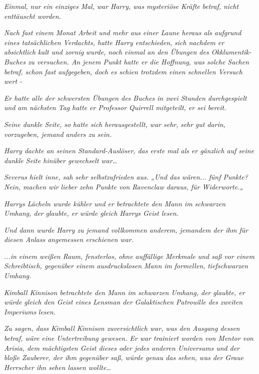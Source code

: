 {\emph{\emph{Einmal,}} \emph{nur} \emph{\emph{ein einziges Mal,}} \emph{war Harry,} \emph{was mysteriöse Kräfte} \emph{betraf, nicht enttäuscht worden.}

\emph{Nach fast einem Monat Arbeit und mehr aus einer Laune heraus als aufgrund eines tatsächlichen Verdachts, hatte Harry entschieden,} \emph{sich nachdem er} \emph{absichtlich kalt und zornig} \emph{wurde,} \emph{noch einmal an den Übungen des Okklumentik-Buches zu versuchen. An jenem Punkt hatte er die Hoffnung, was solche Sachen betraf, schon fast aufgegeben, doch es schien trotzdem einen schnellen Versuch wert -}

\emph{Er hatte alle der schwersten Übungen des Buches in zwei Stunden durchgespielt und am nächsten Tag hatte er Professor Quirrell mitgeteilt, er sei bereit.}

\emph{Seine dunkle Seite, so hatte sich herausgestellt, war sehr,} \emph{\emph{sehr}} \emph{gut darin, vorzugeben, jemand anders zu sein.}

\emph{Harry dachte an seinen Standard-Auslöser, das erste mal als er gänzlich auf seine dunkle Seite hinüber gewechselt war…}

\emph{\emph{Severus hielt inne, sah sehr selbstzufrieden aus. „Und das wären... fünf Punkte? Nein, machen wir lieber zehn Punkte von Ravenclaw daraus, für Widerworte.„}}

\emph{Harrys Lächeln wurde kühler und er betrachtete den Mann im schwarzen Umhang, der} \emph{glaubte, er würde gleich Harrys Geist lesen.}

\emph{Und dann wurde Harry zu jemand vollkommen anderem, jemandem der ihm für diesen Anlass angemessen erschienen war.}

\emph{...in einem weißen Raum, fensterlos, ohne auffällige Merkmale und saß vor einem Schreibtisch, gegenüber einem ausdruckslosen Mann im} \emph{formellen,} \emph{tiefschwarzen Umhang.}

\emph{Kimball Kinnison betrachtete den Mann im schwarzen Umhang, der} \emph{glaubte, er würde gleich den Geist eines Lensman der Galaktischen Patrouille} \emph{des zweiten Imperiums} \emph{lesen.}

\emph{Zu sagen, dass Kimball Kinnison zuversichtlich war, was den Ausgang dessen betraf, wäre eine Untertreibung gewesen. Er war trainiert worden von Mentor von Arisia, dem mächtigsten Geist dieses oder jedes anderen Universums und der bloße Zauberer, der ihm gegenüber saß, würde genau das sehen, was der Graue Herrscher ihn sehen lassen wollte…}

}
